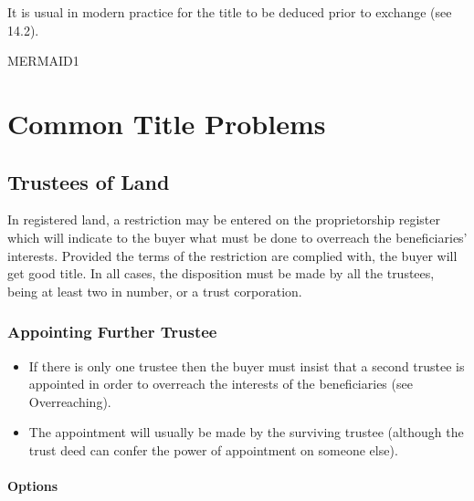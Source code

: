\documentclass[
]{article}
\providecommand{\tightlist}{%
  \setlength{\itemsep}{0pt}\setlength{\parskip}{0pt}}
\begin{document}
It is usual in modern practice for the title to be deduced prior to
exchange (see 14.2).

MERMAID1

\hypertarget{common-title-problems-1}{%
\section{Common Title Problems}\label{common-title-problems-1}}

\hypertarget{trustees-of-land}{%
\subsection{Trustees of Land}\label{trustees-of-land}}

In registered land, a restriction may be entered on the proprietorship
register which will indicate to the buyer what must be done to overreach
the beneficiaries' interests. Provided the terms of the restriction are
complied with, the buyer will get good title. In all cases, the
disposition must be made by all the trustees, being at least two in
number, or a trust corporation.

\hypertarget{appointing-further-trustee}{%
\subsubsection{Appointing Further
Trustee}\label{appointing-further-trustee}}

\begin{itemize}
\tightlist
\item
  If there is only one trustee then the buyer must insist that a second
  trustee is appointed in order to overreach the interests of the
  beneficiaries (see Overreaching).
\item
  The appointment will usually be made by the surviving trustee
  (although the trust deed can confer the power of appointment on
  someone else).
\end{itemize}

\hypertarget{options}{%
\paragraph{Options}\label{options}}
\end{document}
